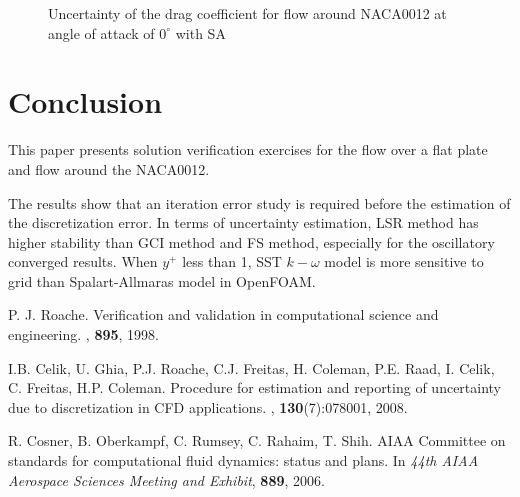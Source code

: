 \documentclass{cfdsc}
\begin{document}
\begin{multicols}{2}
\begin{figure}[H]
\caption{Uncertainty of the drag coefficient for flow around NACA0012 at angle of attack of $ 0^{\circ}$ with SA}
\label{fig:Drag_coefficient_Uncertainty_0_SA}
\end{figure}

\section{Conclusion}
This paper presents solution verification exercises for the flow over a flat plate and flow around the NACA0012.

The results show that an iteration error study is required before the estimation of the discretization error. In terms of uncertainty estimation, LSR method has higher stability than GCI method and FS method, especially for the    oscillatory converged results. When $ y^+ $ less than 1, SST $ k-\omega $ model is more sensitive to grid than Spalart-Allmaras model in OpenFOAM.


\begin{thebibliography}{9}

P. J. Roache.
\newblock Verification and validation in computational science and engineering.
, \textbf{895}, 1998.

I.B. Celik, U. Ghia, P.J. Roache, C.J. Freitas, H. Coleman, P.E. Raad, I. Celik, C. Freitas, H.P. Coleman.
\newblock Procedure for estimation and reporting of uncertainty due to discretization in CFD applications.
, \textbf{130}(7):078001, 2008.

R. Cosner, B. Oberkampf, C. Rumsey, C. Rahaim, T. Shih.
\newblock AIAA Committee on standards for computational fluid dynamics: status and plans.
\newblock In {\em 44th AIAA Aerospace Sciences Meeting and Exhibit}, \textbf{889}, 2006.


\end{thebibliography}
\end{multicols}
\end{document}
